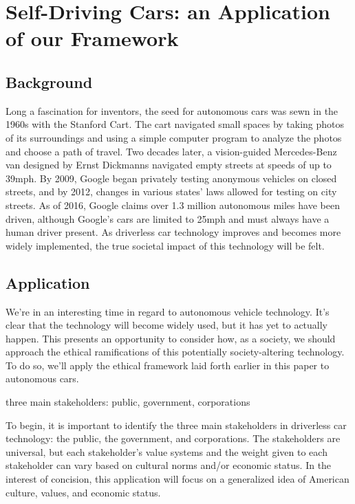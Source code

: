 \section{Self-Driving Cars: an Application of our Framework}
\label{sec:-application}

\subsection{Background}
Long a fascination for inventors, the seed for autonomous cars was sewn 
in the 1960s with the Stanford Cart\cite{moravec1990stanford}. The cart 
navigated small spaces by taking photos of its surroundings and using a 
simple computer program to analyze the photos and choose a path of 
travel. Two decades later, a vision-guided Mercedes-Benz van designed 
by Ernst Dickmanns navigated empty streets at speeds of up to 39mph. By 
2009, Google began privately testing anonymous vehicles on closed 
streets, and by 2012, changes in various states' laws allowed for 
testing on city streets. As of 2016, Google claims over 1.3 million 
autonomous miles have been driven, although Google's cars are limited 
to 25mph and must always have a human driver present.\cite{wired}  As 
driverless car technology improves and becomes more widely implemented, 
the true societal impact of this technology will be felt.


\subsection{Application}

We're in an interesting time in regard to autonomous vehicle technology. 
It's clear that the technology will become widely used, but it has yet 
to actually happen. This presents an opportunity to consider how, as a 
society, we should approach the ethical ramifications of this 
potentially society-altering technology. To do so, we'll apply the 
ethical framework laid forth earlier in this paper to autonomous cars.

{\large three main stakeholders: public, government, corporations}

To begin, it is important to identify the three main stakeholders in 
driverless car technology: the public, the government, and corporations. 
The stakeholders are universal, but each stakeholder's value systems and 
the weight given to each stakeholder can vary based on cultural norms 
and/or economic status. In the interest of concision, this application 
will focus on a generalized idea of American culture, values, and 
economic status.

